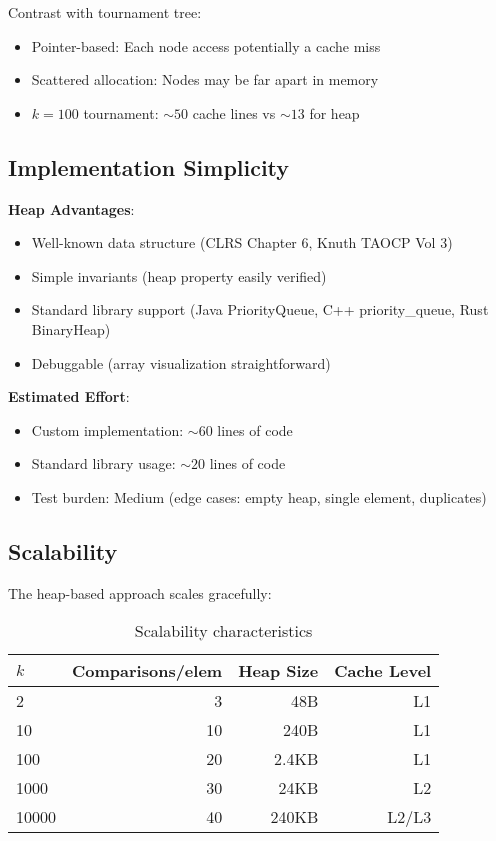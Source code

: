 \documentclass[11pt]{article}
\begin{document}
Contrast with tournament tree:
\begin{itemize}
    \item Pointer-based: Each node access potentially a cache miss
    \item Scattered allocation: Nodes may be far apart in memory
    \item $k = 100$ tournament: $\sim 50$ cache lines vs $\sim 13$ for heap
\end{itemize}

\subsection{Implementation Simplicity}

\textbf{Heap Advantages}:
\begin{itemize}
    \item Well-known data structure (CLRS Chapter 6, Knuth TAOCP Vol 3)
    \item Simple invariants (heap property easily verified)
    \item Standard library support (Java PriorityQueue, C++ priority\_queue, Rust BinaryHeap)
    \item Debuggable (array visualization straightforward)
\end{itemize}

\textbf{Estimated Effort}:
\begin{itemize}
    \item Custom implementation: $\sim 60$ lines of code
    \item Standard library usage: $\sim 20$ lines of code
    \item Test burden: Medium (edge cases: empty heap, single element, duplicates)
\end{itemize}

\subsection{Scalability}

The heap-based approach scales gracefully:

\begin{table}[h]
\centering
\begin{tabular}{lrrr}
\hline
$k$ & Comparisons/elem & Heap Size & Cache Level \\ \hline
2   & 3                & 48B       & L1          \\
10  & 10               & 240B      & L1          \\
100 & 20               & 2.4KB     & L1          \\
1000 & 30              & 24KB      & L2          \\
10000 & 40             & 240KB     & L2/L3       \\ \hline
\end{tabular}
\caption{Scalability characteristics}
\end{table}
\end{document}
